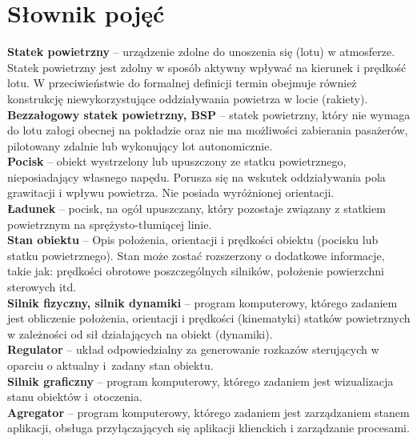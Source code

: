 \chapter*{Słownik pojęć}

\textbf{Statek powietrzny} -- urządzenie zdolne do unoszenia się (lotu) w atmosferze. Statek powietrzny jest zdolny w sposób aktywny wpływać na kierunek i prędkość lotu. W przeciwieństwie do formalnej definicji termin obejmuje również konstrukcję niewykorzystujące oddziaływania powietrza w locie (rakiety).\\

\textbf{Bezzałogowy statek powietrzny, BSP} -- statek powietrzny, który nie wymaga do lotu załogi obecnej na pokładzie oraz nie ma możliwości zabierania pasażerów, pilotowany zdalnie lub wykonujący lot autonomicznie.\\ 

\textbf{Pocisk} -- obiekt wystrzelony lub upuszczony ze statku powietrznego, nieposiadający własnego napędu. Porusza się na wskutek oddziaływania pola grawitacji i wpływu powietrza. Nie posiada wyróżnionej orientacji.\\

\textbf{Ładunek} -- pocisk, na ogół upuszczany, który pozostaje związany z statkiem powietrznym na sprężysto-tłumiącej linie. \\

\textbf{Stan obiektu} -- Opis położenia, orientacji i prędkości obiektu (pocisku lub statku powietrznego). Stan może zostać rozszerzony o dodatkowe informacje, takie jak: prędkości obrotowe poszczególnych silników, położenie powierzchni sterowych itd. \\

\textbf{Silnik fizyczny, silnik dynamiki} -- program komputerowy, którego zadaniem jest obliczenie położenia, orientacji i prędkości (kinematyki) statków powietrznych w zależności od sił działających na obiekt (dynamiki). \\

\textbf{Regulator} -- układ odpowiedzialny za generowanie rozkazów sterujących w oparciu o aktualny i~zadany stan obiektu.\\

\textbf{Silnik graficzny} -- program komputerowy, którego zadaniem jest wizualizacja stanu obiektów i~otoczenia.\\
\newpage
\textbf{Agregator} --  program komputerowy, którego zadaniem jest zarządzaniem stanem aplikacji, obsługa przyłączających się aplikacji klienckich i zarządzanie procesami.\\

